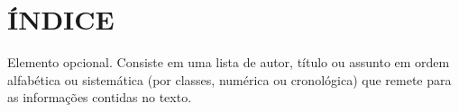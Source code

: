 \chapter*{ÍNDICE}
Elemento opcional. Consiste em uma lista de autor, título ou assunto em ordem alfabética ou sistemática (por classes, numérica ou cronológica) que remete para as informações contidas no texto.